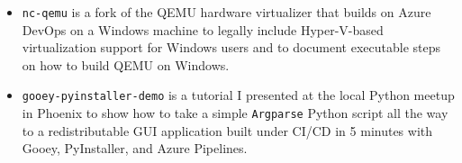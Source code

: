 \documentclass[10pt,letter,ragged2e]{altacv}
\begin{document}
\begin{paracol}{2}



\divider


\begin{itemize}
\item \texttt{nc-qemu} is a fork of the QEMU hardware virtualizer that builds on Azure DevOps on a Windows machine to legally include Hyper-V-based virtualization support for Windows users and to document executable steps on how to build QEMU on Windows. 
\end{itemize}

\divider


\begin{itemize}
\item \texttt{gooey-pyinstaller-demo} is a tutorial I presented at the local Python meetup in Phoenix to show how to take a simple \texttt{Argparse} Python script all the way to a redistributable GUI application built under CI/CD in 5 minutes with Gooey, PyInstaller, and Azure Pipelines. 
\end{itemize}




\end{paracol}
\end{document}
